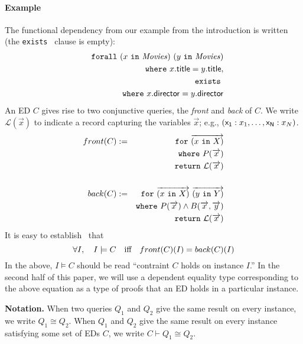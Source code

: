 \documentclass[preprint]{sigplanconf}
\newcommand{\FOR}{{\tt for} \ }
\newcommand{\FORALL}{{\tt forall} \ }
\newcommand{\EXISTS}{{\tt exists} \ }
\newcommand{\WHERE}{{\tt where} \ }
\newcommand{\IN}{ \ {\tt in} \ }
\newcommand{\RETURN}{{\tt return} \ }
\newcommand{\relation}[1]{\ensuremath{\mathit{#1}}\xspace}
\begin{document}
\paragraph{Example}
The functional dependency from our example from the introduction is written (the \EXISTS clause is empty):
\begin{eqnarray*}
& & \FORALL (x \IN \relation{Movies}) \ (y \IN \relation{Movies}) \\
& & \WHERE x.{\sf title} = y.{\sf title}, \\ 
& & \EXISTS \\
& & \WHERE x.{\sf director} = y.{\sf director}
\end{eqnarray*}
An ED $C$ gives rise to two conjunctive queries, the {\it front} and {\it back} of $C$.  We write $\mathcal{L}
(\overrightarrow{x})$ to indicate a record capturing the variables $\overrightarrow{x}
$; e.g., $({\sf x_1}: x_1, \ldots ,{\sf x_N}: x_N)$.  %
\begin{eqnarray*}
front(C)& := & \FOR \overrightarrow{(x \IN X)} \\ 
& & \WHERE P(\overrightarrow{x}) \\
& & \RETURN \mathcal{L}(\overrightarrow{x})  \\
& & \\
back(C) & := & \FOR \overrightarrow{(x \IN X)} \ \overrightarrow{(y \IN Y)} \\ 
& & \WHERE P(\overrightarrow{x}) \wedge B(\overrightarrow{x}, \overrightarrow{y}) \\
& & \RETURN \mathcal{L}(\overrightarrow{x})
\end{eqnarray*}
It is easy to establish~\cite{Popa99anequational} that 
\[
\forall I, \quad I \models C \quad \textnormal{iff} \quad front(C)(I) = back(C)(I)
\]
In the above, $I \models C$ should be read ``contraint $C$ holds on instance $I$.''
In the second half of this paper, we will use a dependent equality type corresponding to the above equation as a type of proofs that an ED holds in a particular instance.

\textbf{Notation.}  When two queries $Q_1$ and $Q_2$ give the same result on every instance, we write $Q_1 \cong Q_2$.  When $Q_1$ and $Q_2$ give the same result on every instance satisfying some set of EDs $C$, we write $C \vdash Q_1 \cong Q_2$.  
\end{document}
